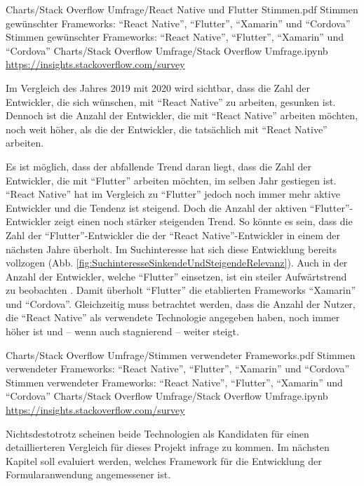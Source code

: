 \begin{alexfigurewithnotebook}{Charts/Stack Overflow Umfrage/React Native und Flutter Stimmen.pdf}
	{Stimmen gewünschter Frameworks: \enquote{React Native}, \enquote{Flutter}, \enquote{Xamarin} und \enquote{Cordova}}
	{Stimmen gewünschter Frameworks: \enquote{React Native}, \enquote{Flutter}, \enquote{Xamarin} und \enquote{Cordova}}
	{Charts/Stack Overflow Umfrage/Stack Overflow Umfrage.ipynb}
	{\url{https://insights.stackoverflow.com/survey}}
	\label{fig:ReactNativeUndFlutterStimmen}

\end{alexfigurewithnotebook}

Im Vergleich des Jahres 2019 mit 2020 wird sichtbar, dass die Zahl der Entwickler, die sich wünschen, mit \enquote{React Native} zu arbeiten, gesunken ist.
Dennoch ist die Anzahl der Entwickler, die mit \enquote{React Native} arbeiten möchten, noch weit höher, als die der Entwickler, die tatsächlich mit \enquote{React Native} arbeiten.

Es ist möglich, dass der abfallende Trend daran liegt, dass die Zahl der Entwickler, die mit \enquote{Flutter} arbeiten möchten, im selben Jahr gestiegen ist.
\enquote{React Native} hat im Vergleich zu \enquote{Flutter} jedoch noch immer mehr aktive Entwickler und die Tendenz ist steigend.
Doch die Anzahl der aktiven \enquote{Flutter}-Entwickler zeigt einen noch stärker steigenden Trend.
So könnte es sein, dass die Zahl der \enquote{Flutter}-Entwickler die der \enquote{React Native}-Entwickler in einem der nächsten Jahre überholt.
Im Suchinteresse hat sich diese Entwicklung bereits vollzogen (Abb. \ref{fig:SuchinteresseSinkendeUndSteigendeRelevanz}).
Auch in der Anzahl der Entwickler, welche \enquote{Flutter} einsetzen, ist ein steiler Aufwärtstrend zu beobachten \Abb{\ref{fig:StimmenVerwendeterFrameworks}}.
Damit überholt \enquote{Flutter} die etablierten Frameworks \enquote{Xamarin} und \enquote{Cordova}.
Gleichzeitig muss betrachtet werden,
dass die Anzahl der Nutzer,
die \enquote{React Native} als verwendete Technologie angegeben haben,
noch immer höher ist und -- wenn auch stagnierend -- weiter steigt.

\begin{alexfigurewithnotebook}{Charts/Stack Overflow Umfrage/Stimmen verwendeter Frameworks.pdf}
	{Stimmen verwendeter Frameworks: \enquote{React Native}, \enquote{Flutter}, \enquote{Xamarin} und \enquote{Cordova}}
	{Stimmen verwendeter Frameworks: \enquote{React Native}, \enquote{Flutter}, \enquote{Xamarin} und \enquote{Cordova}}
	{Charts/Stack Overflow Umfrage/Stack Overflow Umfrage.ipynb}
	{\url{https://insights.stackoverflow.com/survey}}
	\label{fig:StimmenVerwendeterFrameworks}
\end{alexfigurewithnotebook}

Nichtsdestotrotz scheinen beide Technologien als Kandidaten für einen detaillierteren Vergleich für dieses Projekt infrage zu kommen.
Im nächsten Kapitel soll evaluiert werden, welches Framework für die Entwicklung der Formularanwendung angemessener ist.